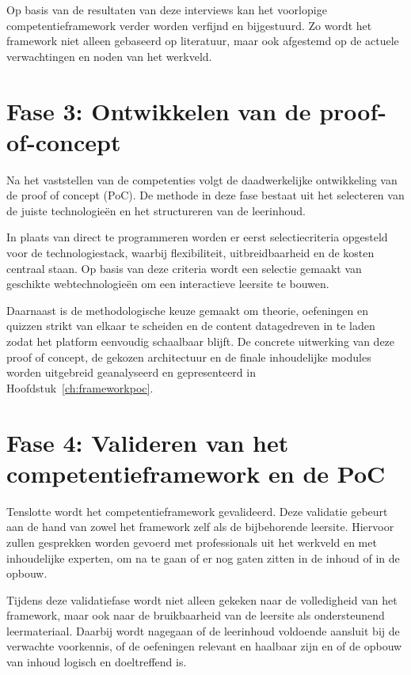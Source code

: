 Op basis van de resultaten van deze interviews kan het voorlopige competentieframework verder worden verfijnd en bijgestuurd.
Zo wordt het framework niet alleen gebaseerd op literatuur, maar ook afgestemd op de actuele verwachtingen en noden van het werkveld.

\section{Fase 3: Ontwikkelen van de proof-of-concept}%
\label{sec:ontwikkelen-proof-of-concept}


Na het vaststellen van de competenties volgt de daadwerkelijke ontwikkeling van de proof of concept (PoC). 
De methode in deze fase bestaat uit het selecteren van de juiste technologieën en het structureren van de leerinhoud.

In plaats van direct te programmeren worden er eerst selectiecriteria opgesteld voor de technologiestack, waarbij flexibiliteit, uitbreidbaarheid en de kosten centraal staan.
Op basis van deze criteria wordt een selectie gemaakt van geschikte webtechnologieën om een interactieve leersite te bouwen. 

Daarnaast is de methodologische keuze gemaakt om theorie, oefeningen en quizzen strikt van elkaar te scheiden en de content datagedreven in te laden zodat het platform eenvoudig schaalbaar blijft.
De concrete uitwerking van deze proof of concept, de gekozen architectuur en de finale inhoudelijke modules worden uitgebreid geanalyseerd en gepresenteerd in Hoofdstuk~\ref{ch:frameworkpoc}.

\section{Fase 4: Valideren van het competentieframework en de PoC}%
\label{sec:valideren-competentieframework}

Tenslotte wordt het competentieframework gevalideerd. 
Deze validatie gebeurt aan de hand van zowel het framework zelf als de bijbehorende leersite.
Hiervoor zullen gesprekken worden gevoerd met professionals uit het werkveld en met inhoudelijke experten, om na te gaan of er nog gaten zitten in de inhoud of in de opbouw.

Tijdens deze validatiefase wordt niet alleen gekeken naar de volledigheid van het framework, maar ook naar de bruikbaarheid van de leersite als ondersteunend leermateriaal.
Daarbij wordt nagegaan of de leerinhoud voldoende aansluit bij de verwachte voorkennis, of de oefeningen relevant en haalbaar zijn en of de opbouw van inhoud logisch en doeltreffend is.

